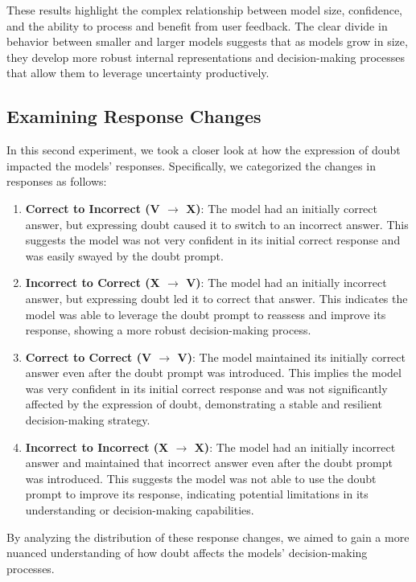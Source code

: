 These results highlight the complex relationship between model size, confidence, and the ability to process and benefit from user feedback. The clear divide in behavior between smaller and larger models suggests that as models grow in size, they develop more robust internal representations and decision-making processes that allow them to leverage uncertainty productively.

\subsection{Examining Response Changes}

In this second experiment, we took a closer look at how the expression of doubt impacted the models' responses. Specifically, we categorized the changes in responses as follows:
\begin{enumerate}
  \item \textbf{Correct to Incorrect (V $\rightarrow$ X)}: The model had an initially correct answer, but expressing doubt caused it to switch to an incorrect answer. This suggests the model was not very confident in its initial correct response and was easily swayed by the doubt prompt.
  \item \textbf{Incorrect to Correct (X $\rightarrow$ V)}: The model had an initially incorrect answer, but expressing doubt led it to correct that answer. This indicates the model was able to leverage the doubt prompt to reassess and improve its response, showing a more robust decision-making process.
  \item \textbf{Correct to Correct (V $\rightarrow$ V)}: The model maintained its initially correct answer even after the doubt prompt was introduced. This implies the model was very confident in its initial correct response and was not significantly affected by the expression of doubt, demonstrating a stable and resilient decision-making strategy.
  \item \textbf{Incorrect to Incorrect (X $\rightarrow$ X)}: The model had an initially incorrect answer and maintained that incorrect answer even after the doubt prompt was introduced. This suggests the model was not able to use the doubt prompt to improve its response, indicating potential limitations in its understanding or decision-making capabilities.
\end{enumerate}

By analyzing the distribution of these response changes, we aimed to gain a more nuanced understanding of how doubt affects the models' decision-making processes.

